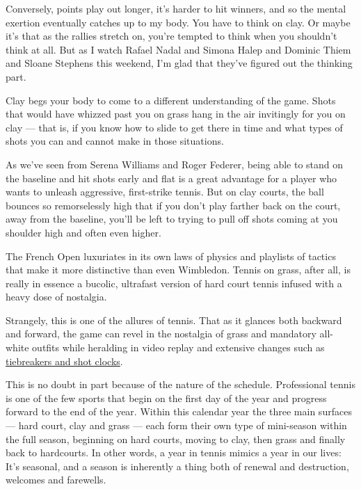 Conversely, points play out longer, it's harder to hit winners, and so
the mental exertion eventually catches up to my body. You have to think
on clay. Or maybe it's that as the rallies stretch on, you're tempted to
think when you shouldn't think at all. But as I watch Rafael Nadal and
Simona Halep and Dominic Thiem and Sloane Stephens this weekend, I'm
glad that they've figured out the thinking part.

Clay begs your body to come to a different understanding of the game.
Shots that would have whizzed past you on grass hang in the air
invitingly for you on clay --- that is, if you know how to slide to get
there in time and what types of shots you can and cannot make in those
situations.

As we've seen from Serena Williams and Roger Federer, being able to
stand on the baseline and hit shots early and flat is a great advantage
for a player who wants to unleash aggressive, first-strike tennis. But
on clay courts, the ball bounces so remorselessly high that if you don't
play farther back on the court, away from the baseline, you'll be left
to trying to pull off shots coming at you shoulder high and often even
higher.

The French Open luxuriates in its own laws of physics and playlists of
tactics that make it more distinctive than even Wimbledon. Tennis on
grass, after all, is really in essence a bucolic, ultrafast version of
hard court tennis infused with a heavy dose of nostalgia.

Strangely, this is one of the allures of tennis. That as it glances both
backward and forward, the game can revel in the nostalgia of grass and
mandatory all-white outfits while heralding in video replay and
extensive changes such as
\href{https://www.atpworldtour.com/en/news/rule-changes-innovation-for-next-gen-atp-finals-2017}{tiebreakers
and shot clocks}.

This is no doubt in part because of the nature of the schedule.
Professional tennis is one of the few sports that begin on the first day
of the year and progress forward to the end of the year. Within this
calendar year the three main surfaces --- hard court, clay and grass ---
each form their own type of mini-season within the full season,
beginning on hard courts, moving to clay, then grass and finally back to
hardcourts. In other words, a year in tennis mimics a year in our lives:
It's seasonal, and a season is inherently a thing both of renewal and
destruction, welcomes and farewells.

